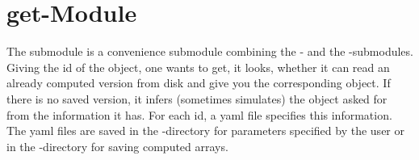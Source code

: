 \chapter{get-Module}

The  submodule is a convenience submodule combining the - and the
-submodules.
Giving the id of the object, one wants to get, it looks, whether it can read
an already computed version from disk and give you the corresponding object.
If there is no saved version, it infers (sometimes simulates) the object asked
for from the information it has.
For each id, a yaml file specifies this information.
The yaml files are saved in the -directory for parameters
specified by the user or in the -directory for saving computed
arrays.
